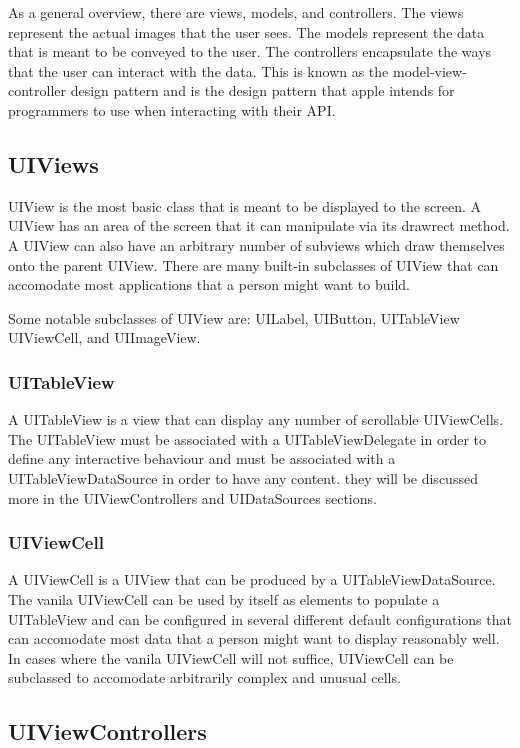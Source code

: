 \documentclass[se]{uw-wkrpt}
\begin{document}
As a general overview, there are views, models, and controllers.
The views represent the actual images that the user sees. The models
represent the data that is meant to be conveyed to the user. The
controllers encapsulate the ways that the user can interact with
the data. This is known as the model-view-controller design pattern
and is the design pattern that apple intends for programmers to use
when interacting with their API.

\subsection{UIViews}

UIView is the most basic class that is meant to be displayed to
the screen. A UIView has an area of the screen that it can manipulate
via its drawrect method. A UIView can also have an arbitrary number of 
subviews which draw themselves onto the parent UIView. There are 
many built-in subclasses of UIView that can accomodate most 
applications that a person might want to build.

Some notable subclasses of UIView are: UILabel, UIButton, UITableView
UIViewCell, and UIImageView.

\subsubsection{UITableView}

A UITableView is a view that can display any number of scrollable 
UIViewCells. The UITableView must be associated with a UITableViewDelegate
in order to define any interactive behaviour and must be associated
with a UITableViewDataSource in order to have any content. they will be
discussed more in the UIViewControllers and UIDataSources sections.

\subsubsection{UIViewCell}

A UIViewCell is a UIView that can be produced by a UITableViewDataSource.
The vanila UIViewCell can be used by itself as elements to populate a
UITableView and can be configured in several different default configurations
that can accomodate most data that a person might want to display reasonably
well. In cases where the vanila UIViewCell will not suffice, UIViewCell can
be subclassed to accomodate arbitrarily complex and unusual cells.

\subsection{UIViewControllers}
\end{document}
